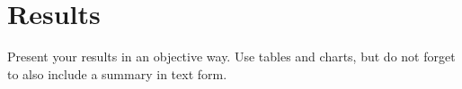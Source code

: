 \section{Results}
\label{sec:results}

Present your results in an objective way. Use tables and charts, but do not forget to also include a summary in text form.
